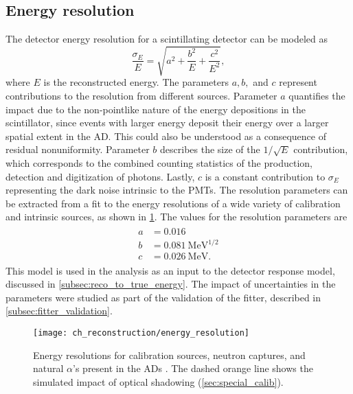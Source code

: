 \subsection{Energy resolution}
\label{subsec:resolution}

The detector energy resolution for a scintillating detector can be modeled as
\cite{energy_resolution}
\begin{equation}\label{eq:energy_resolution}
    \frac{\sigma_E}{E} = \sqrt{a^2 + \frac{b^2}{E} + \frac{c^2}{E^2}},
\end{equation}
where $E$ is the reconstructed energy.
The parameters $a,b,$ and $c$ represent contributions to the resolution
from different sources.
Parameter $a$ quantifies the impact due to the non-pointlike nature
of the energy depositions in the scintillator,
since events with larger energy deposit their energy over a larger spatial extent
in the AD.
This could also be understood as a consequence of residual nonuniformity.
Parameter $b$ describes the size of the $1/\sqrt{E}$ contribution,
which corresponds to the combined counting statistics of
the production, detection and digitization of photons.
Lastly, $c$ is a constant contribution to $\sigma_E$
representing the dark noise intrinsic to the PMTs.
The resolution parameters can be extracted from a fit
to the energy resolutions of a wide variety of calibration and intrinsic sources,
as shown in \cref{fig:resolution}.
The values for the resolution parameters are \cite{ngd2016}
\begin{align}\label{eq:resolution_params}
    \begin{split}
        a &= 0.016 \\
        b &= \SI{0.081}{\MeV\tothe{1/2}} \\
        c &= \SI{0.026}{\MeV}.
    \end{split}
\end{align}
This model is used in the \thetaot{} analysis
as an input to the detector response model,
discussed in \cref{subsec:reco_to_true_energy}.
The impact of uncertainties in the parameters
were studied as part of the validation of the fitter,
described in \cref{subsec:fitter_validation}.

\begin{figure}
    \centering
    \texttt{[image: ch\_reconstruction/energy\_resolution]}
    \caption[Energy resolution]{Energy resolutions for calibration sources, neutron captures,
        and natural $\alpha$'s present in the ADs \cite{ngd2016}.
        The dashed orange line shows the simulated impact
        of optical shadowing (\cref{sec:special_calib}).
    }
    \label{fig:resolution}
\end{figure}


